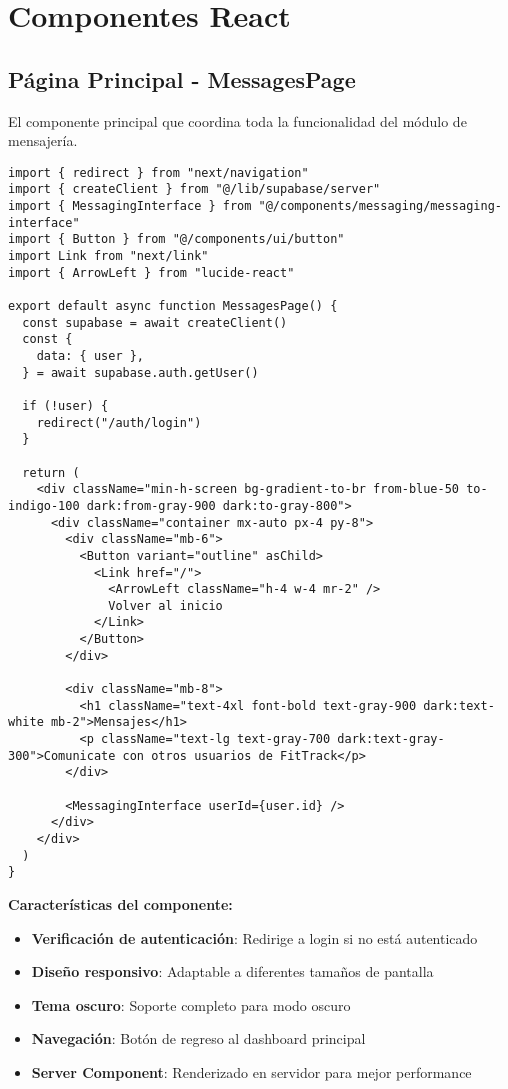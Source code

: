 \documentclass[12pt,a4paper]{article}
\begin{document}
\section{Componentes React}

\subsection{Página Principal - MessagesPage}

El componente principal que coordina toda la funcionalidad del módulo de mensajería.

\begin{lstlisting}[caption=app/messages/page.tsx - Estructura completa]
import { redirect } from "next/navigation"
import { createClient } from "@/lib/supabase/server"
import { MessagingInterface } from "@/components/messaging/messaging-interface"
import { Button } from "@/components/ui/button"
import Link from "next/link"
import { ArrowLeft } from "lucide-react"

export default async function MessagesPage() {
  const supabase = await createClient()
  const {
    data: { user },
  } = await supabase.auth.getUser()

  if (!user) {
    redirect("/auth/login")
  }

  return (
    <div className="min-h-screen bg-gradient-to-br from-blue-50 to-indigo-100 dark:from-gray-900 dark:to-gray-800">
      <div className="container mx-auto px-4 py-8">
        <div className="mb-6">
          <Button variant="outline" asChild>
            <Link href="/">
              <ArrowLeft className="h-4 w-4 mr-2" />
              Volver al inicio
            </Link>
          </Button>
        </div>

        <div className="mb-8">
          <h1 className="text-4xl font-bold text-gray-900 dark:text-white mb-2">Mensajes</h1>
          <p className="text-lg text-gray-700 dark:text-gray-300">Comunicate con otros usuarios de FitTrack</p>
        </div>

        <MessagingInterface userId={user.id} />
      </div>
    </div>
  )
}
\end{lstlisting}

\textbf{Características del componente:}
\begin{itemize}
    \item \textbf{Verificación de autenticación}: Redirige a login si no está autenticado
    \item \textbf{Diseño responsivo}: Adaptable a diferentes tamaños de pantalla
    \item \textbf{Tema oscuro}: Soporte completo para modo oscuro
    \item \textbf{Navegación}: Botón de regreso al dashboard principal
    \item \textbf{Server Component}: Renderizado en servidor para mejor performance
\end{itemize}
\end{document}

